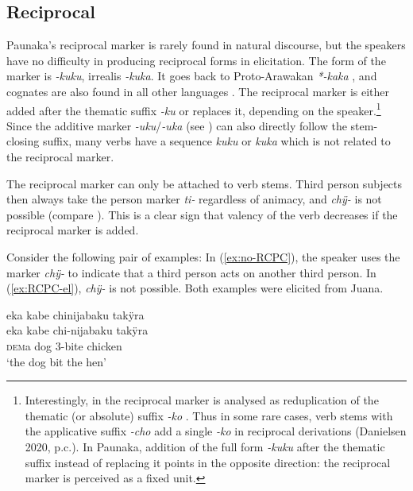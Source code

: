\subsection{Reciprocal}\label{sec:RCPC}

Paunaka’s reciprocal marker is rarely found in natural discourse, but the speakers have no difficulty in producing reciprocal forms in elicitation. The form of the marker is \mbox{\textit{-kuku}}, irrealis \textit{-kuka}. It goes back to Proto-Arawakan \textit{*-kaka} \citep[cf.][293]{Aikhenvald2002}, and cognates are also found in all other  languages \citep[cf.][428]{deCarvalhoPAU}. The reciprocal marker is either added after the thematic suffix  \textit{-ku} or replaces it, depending on the speaker.\footnote{Interestingly, in  the reciprocal marker is analysed as reduplication of the thematic (or absolute) suffix \textit{-ko} \citep[cf.][296]{Danielsen2014a}. Thus in some rare cases, verb stems with the applicative suffix \textit{-cho} add a single \textit{-ko} in reciprocal derivations (Danielsen 2020, p.c.). In Paunaka, addition of the full form \textit{-kuku} after the thematic suffix instead of replacing it points in the opposite direction: the reciprocal marker is perceived as a fixed unit.} Since the additive marker \textit{-uku}/\textit{-uka} (see ) can also directly follow the stem-closing suffix, many verbs have a sequence \textit{kuku} or \textit{kuka} which is not related to the reciprocal marker.

The reciprocal marker can only be attached to  verb stems. Third person subjects then always take the person marker \textit{ti-} regardless of animacy, and \textit{chÿ-} is not possible (compare ). This is a clear sign that valency of the verb decreases if the reciprocal marker is added.

Consider the following pair of examples: In (\ref{ex:no-RCPC}), the speaker uses the marker \textit{chÿ-} to indicate that a third person acts on another third person. In (\ref{ex:RCPC-el}), \textit{chÿ-} is not possible. Both examples were elicited from Juana.

\ea\label{ex:no-RCPC}
\begingl
\glpreamble eka kabe chinijabaku takÿra\\
\gla eka kabe chi-nijabaku takÿra\\
\glb \textsc{dem}a dog 3-bite chicken\\
\glft ‘the dog bit the hen’
\endgl
\trailingcitation{[jxx-e110923l-1.117]}
\xe

